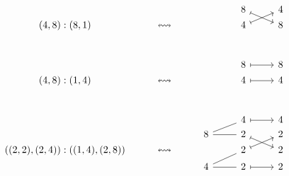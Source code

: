 \[\begin{tikzcd}[row sep = 1, column sep = 12]
  & & & &  & & 8 \ar[drr,mapsto] & & 4 \\
 (4,8):(8,1) & & \leftrightsquigarrow & &   & & 4 \ar[urr,mapsto] & & 8 \\
  & & & &  & &   & &  \\
 & & & &   & &   & &   \\[2em]
 & & & &   & &   & &  \\
 & & & &   & & 8 \ar[rr,mapsto] & & 8  \\
(4,8):(1,4)& & \leftrightsquigarrow& &   & & 4 \ar[rr,mapsto] & & 4  \\
  & & & &  & &   & &    \\
 & & & &   & &   & &   \\[2em]
 & & & &   & &   & &    \\
 & & & &  & & 4 \ar[rr,mapsto] & & 4  \\
& & & & 8 \ar[rr,-] \ar[urr,-] & & 2 \ar[drr,mapsto] & & 2 & & & & \\
 ((2,2),(2,4)):((1,4),(2,8)) & & \leftrightsquigarrow & &   & & 2 \ar[urr,mapsto] & & 2 \\
& & & & 4 \ar[urr,-] \ar[rr,-]  & & 2 \ar[rr,mapsto] & & 2  \\
& & & &   & &   & &   \\
\end{tikzcd}\]

